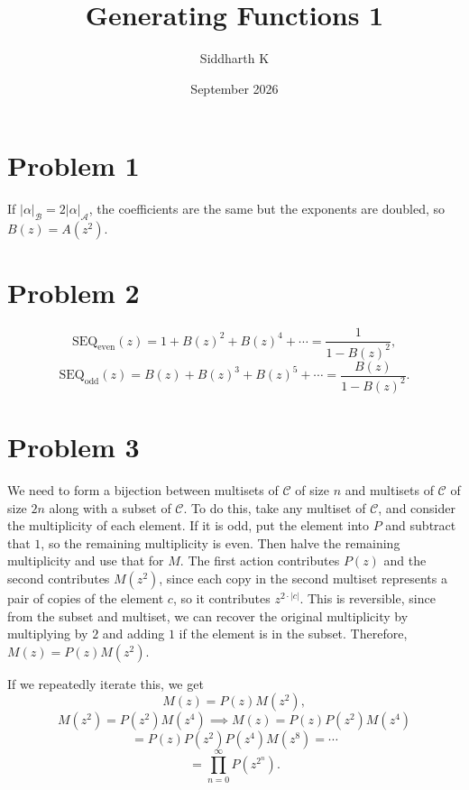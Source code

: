 \documentclass{article}
\title{Generating Functions 1}
\author{Siddharth K}
\date{September 2026}
\newcommand{\mc}[1]{\mathcal{#1}}
\newcommand{\mcC}{\mathcal{C}}
\begin{document}
\maketitle

\section*{Problem 1}
If $|\alpha|_\mc{B} = 2|\alpha|_\mc{A}$, the coefficients are the same but the exponents are doubled, so $B(z) = A(z^2)$.

\section*{Problem 2}
$$\mathrm{SEQ_{even}}(z) = 1 + B(z)^2 + B(z)^4 + \cdots = \frac{1}{1 - B(z)^2},$$
$$\mathrm{SEQ_{odd}}(z) = B(z) + B(z)^3 + B(z)^5 + \cdots = \frac{B(z)}{1 - B(z)^2}.$$

\section*{Problem 3}
We need to form a bijection between multisets of $\mcC$ of size $n$ and multisets of $\mcC$ of size $2n$ along with a subset of $\mcC$. To do this, take any multiset of $\mcC$, and consider the multiplicity of each element. If it is odd, put the element into $P$ and subtract that $1$, so the remaining multiplicity is even. Then halve the remaining multiplicity and use that for $M$. The first action contributes $P(z)$ and the second contributes $M(z^2)$, since each copy in the second multiset represents a pair of copies of the element $c$, so it contributes $z^{2\cdot |c|}$. This is reversible, since from the subset and multiset, we can recover the original multiplicity by multiplying by $2$ and adding $1$ if the element is in the subset. Therefore, $M(z) = P(z)M(z^2)$.

If we repeatedly iterate this, we get
$$M(z) = P(z)M(z^2),$$
$$M(z^2) = P(z^2)M(z^4) \implies M(z) = P(z)P(z^2)M(z^4)$$
$$= P(z)P(z^2)P(z^4)M(z^8) = \cdots$$
$$= \prod_{n = 0}^\infty P(z^{2^n}).$$
\end{document}
